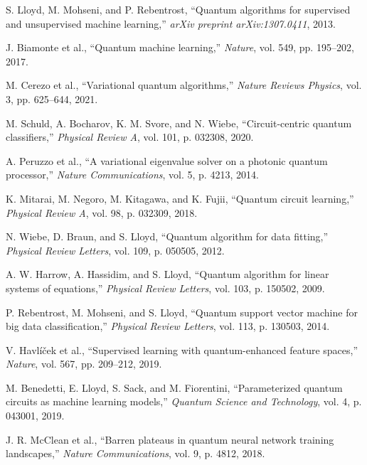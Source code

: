 \documentclass[11pt]{article}
\begin{document}

\begin{thebibliography}{30}

S. Lloyd, M. Mohseni, and P. Rebentrost, ``Quantum algorithms for supervised and unsupervised machine learning,'' \textit{arXiv preprint arXiv:1307.0411}, 2013.

J. Biamonte et al., ``Quantum machine learning,'' \textit{Nature}, vol. 549, pp. 195--202, 2017.

M. Cerezo et al., ``Variational quantum algorithms,'' \textit{Nature Reviews Physics}, vol. 3, pp. 625--644, 2021.

M. Schuld, A. Bocharov, K. M. Svore, and N. Wiebe, ``Circuit-centric quantum classifiers,'' \textit{Physical Review A}, vol. 101, p. 032308, 2020.

A. Peruzzo et al., ``A variational eigenvalue solver on a photonic quantum processor,'' \textit{Nature Communications}, vol. 5, p. 4213, 2014.

K. Mitarai, M. Negoro, M. Kitagawa, and K. Fujii, ``Quantum circuit learning,'' \textit{Physical Review A}, vol. 98, p. 032309, 2018.

N. Wiebe, D. Braun, and S. Lloyd, ``Quantum algorithm for data fitting,'' \textit{Physical Review Letters}, vol. 109, p. 050505, 2012.

A. W. Harrow, A. Hassidim, and S. Lloyd, ``Quantum algorithm for linear systems of equations,'' \textit{Physical Review Letters}, vol. 103, p. 150502, 2009.

P. Rebentrost, M. Mohseni, and S. Lloyd, ``Quantum support vector machine for big data classification,'' \textit{Physical Review Letters}, vol. 113, p. 130503, 2014.

V. Havlíček et al., ``Supervised learning with quantum-enhanced feature spaces,'' \textit{Nature}, vol. 567, pp. 209--212, 2019.

M. Benedetti, E. Lloyd, S. Sack, and M. Fiorentini, ``Parameterized quantum circuits as machine learning models,'' \textit{Quantum Science and Technology}, vol. 4, p. 043001, 2019.

J. R. McClean et al., ``Barren plateaus in quantum neural network training landscapes,'' \textit{Nature Communications}, vol. 9, p. 4812, 2018.


\end{thebibliography}
\end{document}
